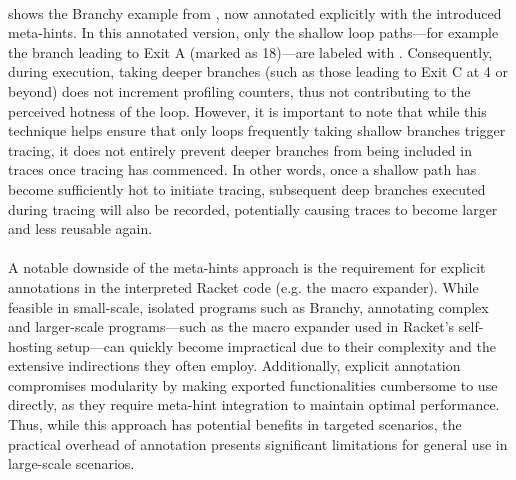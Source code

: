 
    \paragraph{}%
       shows the Branchy example from , now annotated explicitly with the introduced meta-hints. In this annotated version, only the shallow loop paths—for example the branch leading to Exit A (marked as \textcircled{\scriptsize{18}})—are labeled with . Consequently, during execution, taking deeper branches (such as those leading to Exit C at \textcircled{\scriptsize{4}} or beyond) does not increment profiling counters, thus not contributing to the perceived hotness of the loop. However, it is important to note that while this technique helps ensure that only loops frequently taking shallow branches trigger tracing, it does not entirely prevent deeper branches from being included in traces once tracing has commenced. In other words, once a shallow path has become sufficiently hot to initiate tracing, subsequent deep branches executed during tracing will also be recorded, potentially causing traces to become larger and less reusable again.

    \paragraph{}%
      A notable downside of the meta-hints approach is the requirement for explicit annotations in the interpreted Racket code (e.g. the macro expander). While feasible in small-scale, isolated programs such as Branchy, annotating complex and larger-scale programs—such as the macro expander used in Racket's self-hosting setup—can quickly become impractical due to their complexity and the extensive indirections they often employ. Additionally, explicit annotation compromises modularity by making exported functionalities cumbersome to use directly, as they require meta-hint integration to maintain optimal performance. Thus, while this approach has potential benefits in targeted scenarios, the practical overhead of annotation presents significant limitations for general use in large-scale scenarios.

